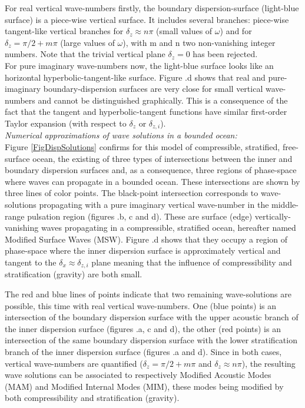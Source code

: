 \documentclass[a4paper,11pt]{article}
\begin{document}
For real vertical wave-numbers firstly, the boundary dispersion-surface (light-blue surface) is a piece-wise vertical surface. It includes several branches: piece-wise tangent-like vertical branches for $\delta_z \approx n\pi$ (small values of $\omega$) and for $\delta_z = \pi/2+m\pi$ (large values of $\omega$), with m and n two non-vanishing integer numbers. Note that the trivial vertical plane $\delta_z=0$ has been rejected.\\
For pure imaginary wave-numbers now, the light-blue surface looks like an horizontal hyperbolic-tangent-like surface. Figure .d shows that real and pure-imaginary boundary-dispersion surfaces are very close for small vertical wave-numbers and cannot be distinguished graphically. This is a consequence of the fact that the tangent and hyperbolic-tangent functions have similar first-order Taylor expansion (with respect to $\delta_z$ or $\delta_{z,i}$).\\

\textit{Numerical approximations of wave solutions in a bounded ocean:}\\
Figure \ref{FigDispSolutions} confirms for this model of compressible, stratified, free-surface ocean, the existing of three types of intersections between the inner and boundary dispersion surfaces and, as a consequence, three regions of phase-space where waves can propagate in a bounded ocean. These intersections are shown by three lines of color points. The black-point intersection corresponds to wave-solutions propagating with a pure imaginary vertical wave-number in the middle-range pulsation region (figures .b, c and d). These are surface (edge) vertically-vanishing waves propagating in a compressible, stratified ocean, hereafter named Modified Surface Waves (MSW). Figure .d shows that they occupy a region of phase-space where the inner dispersion surface is approximately vertical and tangent to the $\delta_x\approx\delta_{z,i}$ plane meaning that the influence of compressibility and stratification (gravity) are both small. 

The red and blue lines of points indicate that two remaining wave-solutions are possible, this time with real vertical wave-numbers. One (blue points) is an intersection of the boundary dispersion surface with the upper acoustic branch of the inner dispersion surface (figures .a, c and d), the other (red points) is an intersection of the same boundary dispersion surface with the lower stratification branch of the inner dispersion surface (figures .a and d). Since in both cases, vertical wave-numbers are quantified ($\delta_z = \pi/2+m\pi$ and $\delta_z \approx n\pi$), the resulting wave solutions can be associated to respectively Modified Acoustic Modes (MAM) and Modified Internal Modes (MIM), these modes being modified by both compressibility and stratification (gravity).\\
\end{document}
